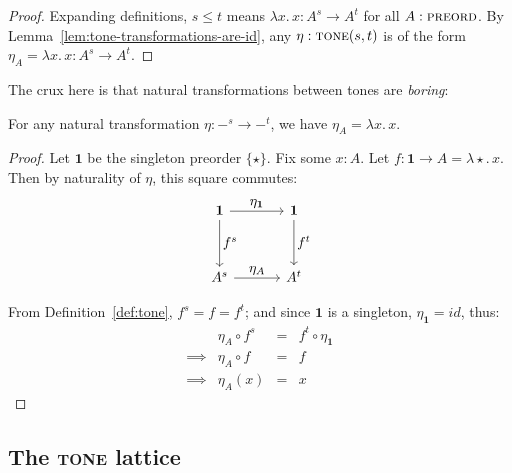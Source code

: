 \documentclass{rntz}
\newcommand{\mb}[1]{\ensuremath{\mathbf{#1}}}
\newcommand{\mi}[1]{\ensuremath{\mathit{#1}}}
\newcommand{\fn}{\lambda}
\newcommand{\binder}{.\,}
\newcommand{\bind}[1]{{#1}\binder}
\newcommand{\fnof}[1]{\fn\bind{#1}}
\newcommand{\cat}[1]{\textsc{#1}} %
\newcommand{\Pre}{\cat{preord}}
\newcommand{\Tone}{\cat{tone}}
\newcommand{\idfn}{\mi{id}}
\begin{document}
\begin{proof}
  Expanding definitions, $s \le t$ means $\fnof{x} x : A^s \to A^t$ for all $A :
  \Pre$. By Lemma~\ref{lem:tone-transformations-are-id}, any $\eta : \Tone(s,t)$
  is of the form $\eta_A = \fnof{x} x : A^s \to A^t$.
\end{proof}

The crux here is that natural transformations between tones are \emph{boring}:
\begin{lemma}\label{lem:tone-transformations-are-id}
  For any natural transformation $\eta : -^s \to -^t$, we have $\eta_A = \fnof{x} x$.
\end{lemma}

\begin{proof}
  Let $\mb{1}$ be the singleton preorder $\{\star\}$. Fix some $x : A$. Let $f :
  \mb{1} \to A = \fnof{\star}{x}$. Then by naturality of $\eta$, this square
  commutes:
  \[\tikzset{
    no line/.style={draw=none,
      commutative diagrams/every label/.append style={/tikz/auto=false}}}
  \begin{tikzcd}[sep=3.3em]
    \mb{1} \arrow[r,"\textstyle \eta_{\mb{1}}"] \arrow[d,"\textstyle f^s"]
    & \mb{1} \arrow[d,"\textstyle f^t"]
    \\ A^s \arrow[r,"\textstyle\eta_A"]
    & A^t
  \end{tikzcd}\]

From Definition~\ref{def:tone}, $f^s = f = f^t$; and since $\mb{1}$ is a
singleton, $\eta_{\mb{1}} = \idfn$, thus:
  \[\begin{array}{rlcl}
  & \eta_A \circ f^s &=& f^t \circ \eta_{\mb{1}}\\
  \implies & \eta_A \circ f &=& f\\
  \implies & \eta_A(x) &=& x
  \end{array}\]
\end{proof}




\subsection{The \Tone{} lattice}
\end{document}
